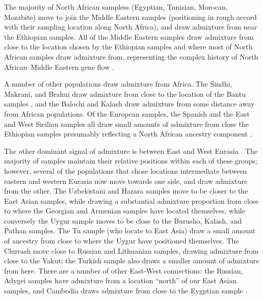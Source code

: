 \documentclass[12pt]{article}
\begin{document}
The majority of North African sampless (Egyptian, Tunisian, Morocan, Mozabite) move to join the Middle Eastern samples (positioning in rough accord with their sampling location along North Africa), and draw admixture from near the Ethiopian samples. All of the Middle Eastern samples draw admixture from close to the location chosen by the Ethiopian samples and where most of North African samples draw admixture from, representing the complex history of North African--Middle Eastern gene flow \citep{henn_genomic_2012,Hellenthal}. 




A number of other populations draw admixture from Africa. The Sindhi, Makrani, and Brahui draw admixture from close to the location of the Bantu samples \citep{Hellenthal}, and the Balochi and Kalash draw admixture from some distance away from African populations.  Of the European samples, the Spanish and the East and West Sicilian samples all draw small amounts of admixture from close the Ethiopian samples presumably reflecting a North African ancestry component \citep{moorjani_history_2011,botigue_gene_2013}. 

The other dominant signal of admixture is between East and West Eurasia \citep[a signal documented by many authors][]{rosenberg_genetic_2002,li_worldwide_2008, xu_genome-wide_2008,Hellenthal}. The majority of samples maintain their relative positions within each of these groups; however, several of the populations that chose locations intermediate between eastern and western Eurasia now move towards one side, and draw admixture from the other.  The Uzbekistani and Hazara samples move to be closer to the East Asian samples, while drawing a substantial admixture proportion from close to where the Georgian and Armenian samples have located themselves, while conversely the Uygur sample moves to be close to the Burusho, Kalash, and Pathan samples. The Tu sample (who locate to East Asia) draw a small amount of ancestry from close to where the Uygur have positioned themselves. The Chuvash move close to Russian and Lithuanian samples, drawing admixture from close to the Yakut; the Turkish sample also draws a smaller amount of admixture from here. There are a number of other East-West connections: the Russian, Adygei samples have admixture from a location ``north'' of our East Asian samples, and Cambodia draws admixture from close to the Eygptian sample \citep{Treemix, Hellenthal}. 
\end{document}
